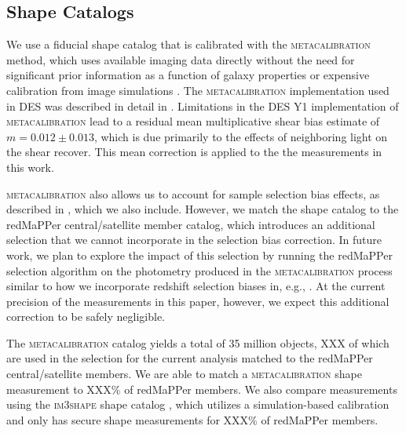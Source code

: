 \documentclass[fleqn,usenatbib]{mnras}
\begin{document}
\subsection{Shape Catalogs}

We use a fiducial shape catalog that is calibrated with the \textsc{metacalibration} method, which uses available imaging data directly without the need for significant prior information as a function of galaxy properties or expensive calibration from image simulations \cite{HuffMandelbaum2017,SheldonHuff2017}. The \textsc{metacalibration} implementation used in DES was described in detail in \cite{shearcat}. Limitations in the DES Y1 implementation of \textsc{metacalibration} lead to a residual mean multiplicative shear bias estimate of $m = 0.012 \pm 0.013$, which is due primarily to the effects of neighboring light on the shear recover. This mean correction is applied to the the measurements in this work. 

\textsc{metacalibration} also allows us to account for sample selection bias effects, as described in \cite{shearcat,shearcorr}, which we also include. However, we match the shape catalog to the redMaPPer central/satellite member catalog, which introduces an additional selection that we cannot incorporate in the selection bias correction. In future work, we plan to explore the impact of this selection by running the redMaPPer selection algorithm on the photometry produced in the \textsc{metacalibration} process similar to how we incorporate redshift selection biases in, e.g., \cite{shearcorr}. At the current precision of the measurements in this paper, however, we expect this additional correction to be safely negligible.

The \textsc{metacalibration} catalog yields a total of 35 million objects, XXX of which are used in the selection for the current analysis matched to the redMaPPer central/satellite members. We are able to match a \textsc{metacalibration} shape measurement to XXX\% of redMaPPer members. We also compare measurements using the \textsc{im3shape} shape catalog \cite{shearcat,2013MNRAS.434.1604Z}, which utilizes a simulation-based calibration and only has secure shape measurements for XXX\% of redMaPPer members.

\end{document}
